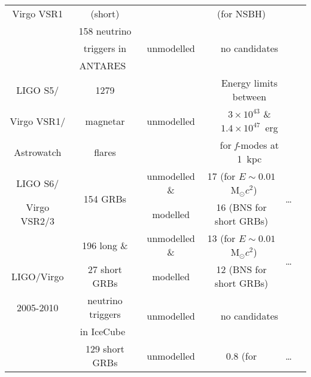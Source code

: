 \begin{longtable}{c|ccccc}
Virgo VSR1 & (short)         &                             & (for NSBH) &                         & \\
\cline{2-6}
           & 158 neutrino                       & \multirow{3}{*}{unmodelled} & \multicolumn{2}{c}{\multirow{3}{*}{no candidates}} & \multirow{3}{*}{\cite{2013JCAP...06..008A}} \\
           & triggers in                        &                             &                                                    & \\
           & ANTARES~\cite{2011NIMPA.656...11A} &                             &                                                    & \\
\hline
LIGO S5/    & 1279     & \multirow{3}{*}{unmodelled} & \multicolumn{2}{c}{Energy limits between}         & \multirow{3}{*}{\cite{Abadie:2010c}} \\
Virgo VSR1/ & magnetar &                             & \multicolumn{2}{c}{$3\!\times\!10^{43}$ \& $1.4\!\times\!10^{47}$~erg} & \\
Astrowatch  & flares   &                             & \multicolumn{2}{c}{for \textit{f}-modes at 1~kpc} & \\
\hline
LIGO S6/     & \multirow{2}{*}{154 GRBs} & unmodelled \& & 17 (for $E \sim 0.01$~M$_{\odot}c^2$) & \multirow{2}{*}{\ldots} & 
\multirow{2}{*}{\cite{2012ApJ...760...12A}} \\
Virgo VSR2/3 &                           & modelled      & 16 (BNS for short GRBs)               &                          &  \\
\hline
           & 196 long \&   & unmodelled \& & 13 (for $E \sim 0.01$~M$_{\odot}c^2$) & \multirow{2}{*}{\ldots} & \multirow{2}{*}{\cite{2014PhRvL.113a1102A}} \\
LIGO/Virgo & 27 short GRBs & modelled      & 12 (BNS for short GRBs)               &                         & \\
\cline{2-6}
2005-2010  & neutrino triggers                     & \multirow{2}{*}{unmodelled} & \multicolumn{2}{c}{\multirow{2}{*}{no candidates}} & \multirow{2}{*}{\cite{2014PhRvD..90j2002A}} \\
           & in IceCube~\cite{2006APh....26..155I} &                                                    & \\
\hline
            & \multirow{3}{*}{129 short GRBs} & \multirow{3}{*}{unmodelled} & 0.8 (for                   & \multirow{3}{*}{\ldots} & \multirow{3}{*}{\cite{2014PhRvD..89l2004A}} \\

\end{longtable}

